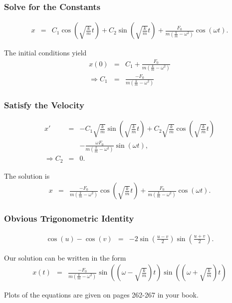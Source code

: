 \documentclass{beamer}
\newcommand{\lp}{\left(}
\newcommand{\rp}{\right)}
\begin{document}
\begin{frame}
  \frametitle{Solve for the Constants}

  \begin{eqnarray*}
    x & = & C_1 \cos\lp\sqrt{\frac{k}{m}}t\rp + C_2 \sin\lp\sqrt{\frac{k}{m}}t\rp+ 
           \frac{F_0}{m\lp\frac{k}{m}-\omega^2\rp} \cos(\omega t).
  \end{eqnarray*}

  The initial conditions yield
  \begin{eqnarray*}
    x(0) & = & C_1 + \frac{F_0}{m\lp\frac{k}{m}-\omega^2\rp} \\
    \Rightarrow C_1 & = & \frac{-F_0}{m\lp\frac{k}{m}-\omega^2\rp}
  \end{eqnarray*}

\end{frame}


\begin{frame}
  \frametitle{Satisfy the Velocity}

  \begin{eqnarray*}
    x' & = & - C_1 \sqrt{\frac{k}{m}} \sin\lp\sqrt{\frac{k}{m}}t\rp + C_2 \sqrt{\frac{k}{m}} \cos\lp\sqrt{\frac{k}{m}}t\rp \\ 
    & & - \frac{\omega F_0}{m\lp\frac{k}{m}-\omega^2\rp} \sin(\omega t), \\
    \Rightarrow C_2 & = & 0.
  \end{eqnarray*}

  The solution is 
  \begin{eqnarray*}
    x & = & \frac{-F_0}{m\lp\frac{k}{m}-\omega^2\rp} \cos\lp\sqrt{\frac{k}{m}}t\rp 
    + \frac{F_0}{m\lp\frac{k}{m}-\omega^2\rp} \cos(\omega t).
  \end{eqnarray*}


\end{frame}


\begin{frame}
  \frametitle{Obvious Trigonometric Identity}

  \begin{eqnarray*}
    \cos(u) - \cos(v) & = & -2 \sin\lp\frac{u-v}{2}\rp \sin\lp\frac{u+v}{2}\rp.
  \end{eqnarray*}

  Our solution can be written in the form
  \begin{eqnarray*}
    x(t) & = & \frac{-F_0}{m\lp\frac{k}{m}-\omega^2\rp} \sin\lp\lp\omega-\sqrt{\frac{k}{m}}\rp t\rp
                                                        \sin\lp\lp\omega+\sqrt{\frac{k}{m}}\rp t\rp
  \end{eqnarray*}

  Plots of the equations are given on pages 262-267 in your book.

\end{frame}
\end{document}
